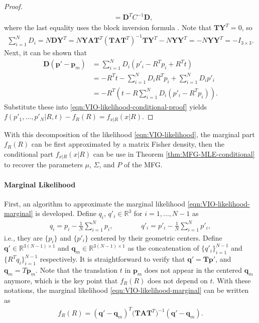 \begin{proof}
\begin{align*}
		&= \mathbf{D}^T C^{-1} \mathbf{D},
	\end{align*}
	where the last equality uses the block inversion formula \cite{petersen2008matrix}.
	Note that $\mathbf{TY}^T = 0$, so
	\begin{align*}
		\sum_{i=1}^N D_i = N\mathbf{DY}^T = N\mathbf{YAT}^T (\mathbf{TAT}^T)^{-1} \mathbf{TY}^T - N\mathbf{YY}^T = -N\mathbf{YY}^T = -I_{3\times 3}.
	\end{align*}
	Next, it can be shown that
	\begin{align*}
		\mathbf{D}(\bm{p}' - \bm{p}_m) &= \sum_{i=1}^N D_i(p'_i - R^Tp_i + R^Tt) \\
		&= -R^Tt - \sum_{i=1}^N D_iR^Tp_i + \sum_{i=1}^N D_ip'_i \\
		&= -R^T\left( t - R\sum_{i=1}^N D_i(p'_i-R^Tp_i) \right).
	\end{align*}
	Substitute these into \eqref{eqn:VIO-likelihood-conditional-proof} yields $f(p'_1,\ldots,p'_N | R,t) - f_R(R) = f_{x|R}(x|R)$.
\end{proof}

With this decomposition of the likelihood \eqref{eqn:VIO-likelihood}, the marginal part $f_R(R)$ can be first approximated by a matrix Fisher density, then the conditional part $f_{x|R}(x|R)$ can be use in Theorem \ref{thm:MFG-MLE-conditional} to recover the parameters $\mu$, $\Sigma$, and $P$ of the MFG.

\paragraph{Marginal Likelihood}

First, an algorithm to approximate the marginal likelihood \eqref{eqn:VIO-likelihood-marginal} is developed.
Define $q_i$, $q'_i\in\mathbb{R}^3$ for $i = 1,\ldots,N-1$ as
\begin{align} \label{eqn:VIO-centering}
	q_i = p_i-\frac{1}{N} \sum_{i=1}^N p_i, \qquad\qquad q'_i = p'_i - \frac{1}{N} \sum_{i=1}^N p'_i,
\end{align}
i.e., they are $\{p_i\}$ and $\{p'_i\}$ centered by their geometric centers.
Define $\bm{q'}\in\mathbb{R}^{3(N-1)\times 1}$ and $\bm{q}_m\in\mathbb{R}^{3(N-1)\times 1}$ as the concatenation of $\{q'_i\}_{i=1}^{N-1}$ and $\{R^Tq_i\}_{i=1}^{N-1}$ respectively.
It is straightforward to verify that $\bm{q}' = \mathbf{T}\bm{p}'$, and $\bm{q}_m = T\bm{p}_m$.
Note that the translation $t$ in $\bm{p}_m$ does not appear in the centered $\bm{q}_m$ anymore, which is the key point that $f_R(R)$ does not depend on $t$.
With these notations, the marginal likelihood \eqref{eqn:VIO-likelihood-marginal} can be written as
\begin{align} \label{eqn:VIO-likelihood-marginal-q}
	f_R(R) = (\bm{q}'-\bm{q}_m)^T \big(\mathbf{T}\mathbf{A}\mathbf{T}^T\big)^{-1} (\bm{q}'-\bm{q}_m).
\end{align}

